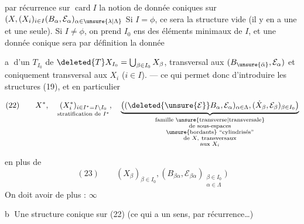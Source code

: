 par récurrence sur $\operatorname{card}I$ la notion de
donnée  coniques sur 
$(X,(X_i)_{i\in I}(B_\alpha,\mathcal E_\alpha)_{\alpha\in\unsure{\lambda|\Lambda}}$
 Si $I=\phi$, ce sera la structure
vide (il y en a une et une seule). Si
$I\ne\phi$, on prend $I_0$ ens des éléments minimaux
de $I$, et une donnée conique sera par
définition la donnée

\textcircled{a} d'un  $T_{I_0}$
de  $\deleted{T}X_{I_0}=\bigcup_{\beta\in I_0}X_\beta$,
transversal aux $(B_{\unsure{\bar\alpha}},\mathcal E_\alpha)$ et
coniquement transversal aux $X_i$ ($i\in I$).
--- ce qui permet donc d'introduire les
structures (19), et en particulier

\[
(22)\qquad
X^*,\quad
\underset{\text{stratification de }I^*}{(X_i^*)_{i\in I^*=I\setminus I_0}},
\quad
\underbrace{\big((\deleted{\unsure{\mathcal E}}B_\alpha,\mathcal E_\alpha)_{\alpha\in\Lambda},
(\dot X_\beta,\mathcal E_\beta)_{\beta\in I_0}\big)}
_{\substack{\text{famille \unsure{transverse|transversale}}\\\text{de sous-espaces}\\
\text{\unsure{bordants} ``cylindrisés''}\\
\text{de }X,\ \text{transversaux}\\\text{aux }X_i}}
\]

en plus de
\[
(23)\qquad
(X_\beta)_{\beta\in I_0},
(B_{\beta\alpha},\mathcal E_{\beta\alpha})_{\substack{\beta\in I_0\\\alpha\in\Lambda}}\big)
\]
On doit avoir de plus : $\infty$

\textcircled{b} Une structure conique sur (22) (ce qui
a un sens, par récurrence\ldots)
